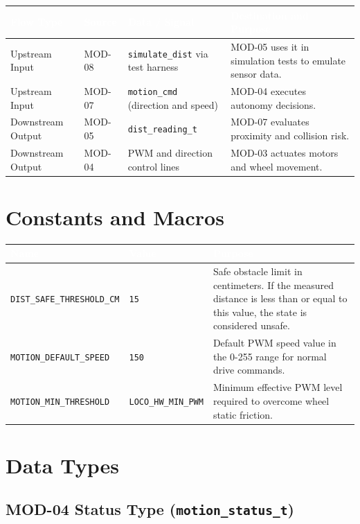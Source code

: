 \documentclass[a4paper,11pt]{article}
\newcommand{\theadtext}[1]{\textcolor{white}{\textbf{#1}}}
\begin{document}
\begin{tabular}{L{2.72cm} L{2.38cm} L{4.25cm} L{7.48cm}}
\toprule
{}
\theadtext{Flow Type} & \theadtext{Source} & \theadtext{Data / Signal} & \theadtext{Destination and Purpose} \\
\midrule
{}   Upstream Input   & MOD-08 & \texttt{simulate\_dist} via test harness & MOD-05 uses it in simulation tests to emulate sensor data. \\
 Upstream Input   & MOD-07 & \texttt{motion\_cmd} (direction and speed) & MOD-04 executes autonomy decisions. \\
   Downstream Output & MOD-05 & \texttt{dist\_reading\_t} & MOD-07 evaluates proximity and collision risk. \\
 Downstream Output & MOD-04 & PWM and direction control lines & MOD-03 actuates motors and wheel movement. \\
\bottomrule
\end{tabular}

\section{Constants and Macros}

\begin{tabular}{L{5.1cm} L{2.6cm} L{9.13cm}}
\toprule
{}
\theadtext{Name} & \theadtext{Value} & \theadtext{Purpose} \\
\midrule
{}   \texttt{DIST\_SAFE\_THRESHOLD\_CM} & \texttt{15} & Safe obstacle limit in centimeters. If the measured distance is less than or equal to this value, the state is considered unsafe. \\
 \texttt{MOTION\_DEFAULT\_SPEED}    & \texttt{150} & Default PWM speed value in the 0-255 range for normal drive commands. \\
   \texttt{MOTION\_MIN\_THRESHOLD}    & \texttt{LOCO\_HW\_MIN\_PWM} & Minimum effective PWM level required to overcome wheel static friction. \\
\bottomrule
\end{tabular}

\section{Data Types}

\subsection{MOD-04 Status Type (\texttt{motion\_status\_t})}
\end{document}
